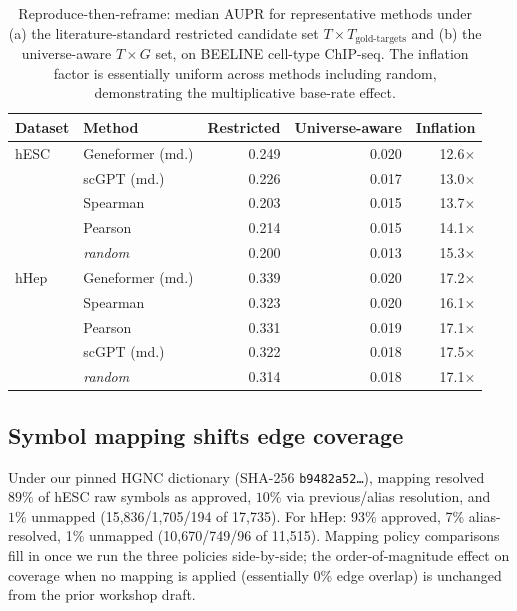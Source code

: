 \documentclass[sigconf]{acmart}
\begin{document}
\begin{table}[t]
\caption{Reproduce-then-reframe: median AUPR for representative methods
under (a) the literature-standard restricted candidate set
$T \times T_{\text{gold-targets}}$ and (b) the universe-aware
$T \times G$ set, on BEELINE cell-type ChIP-seq. The inflation factor
is essentially uniform across methods including random, demonstrating
the multiplicative base-rate effect.}
\label{tab:reframe}
\small
\begin{tabular}{llrrr}
\toprule
Dataset & Method & Restricted & Universe-aware & Inflation \\
\midrule
hESC & Geneformer (md.) & 0.249 & 0.020 & 12.6$\times$ \\
     & scGPT (md.)      & 0.226 & 0.017 & 13.0$\times$ \\
     & Spearman         & 0.203 & 0.015 & 13.7$\times$ \\
     & Pearson          & 0.214 & 0.015 & 14.1$\times$ \\
     & \emph{random}    & 0.200 & 0.013 & 15.3$\times$ \\
\midrule
hHep & Geneformer (md.) & 0.339 & 0.020 & 17.2$\times$ \\
     & Spearman         & 0.323 & 0.020 & 16.1$\times$ \\
     & Pearson          & 0.331 & 0.019 & 17.1$\times$ \\
     & scGPT (md.)      & 0.322 & 0.018 & 17.5$\times$ \\
     & \emph{random}    & 0.314 & 0.018 & 17.1$\times$ \\
\bottomrule
\end{tabular}
\end{table}

\subsection{Symbol mapping shifts edge coverage}
\label{sec:mapping_results}

Under our pinned HGNC dictionary (SHA-256 \texttt{b9482a52\ldots}),
mapping resolved $89\%$ of hESC raw symbols as approved, $10\%$ via
previous/alias resolution, and $1\%$ unmapped
(15{,}836/1{,}705/194 of 17{,}735). For hHep:
93\% approved, 7\% alias-resolved, 1\% unmapped (10{,}670/749/96 of
11{,}515). Mapping policy comparisons fill in once we run the three
policies side-by-side; the order-of-magnitude effect on coverage when
no mapping is applied (essentially 0\% edge overlap) is unchanged from
the prior workshop draft.
\end{document}
